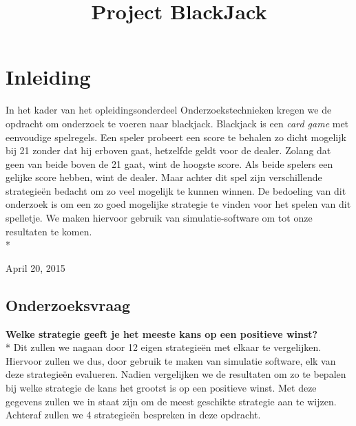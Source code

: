 \documentclass[conference]{IEEEtran}
\begin{document}
\title{Project BlackJack}
\author{
}
\maketitle

\IEEEpeerreviewmaketitle

\section{Inleiding}
In het kader van het opleidingsonderdeel Onderzoekstechnieken kregen we de opdracht om onderzoek te voeren naar blackjack. Blackjack is een {\it card game} met eenvoudige spelregels. Een speler probeert een score te behalen zo dicht mogelijk bij 21 zonder dat hij erboven gaat, hetzelfde geldt voor de dealer. Zolang dat geen van beide boven de 21 gaat, wint de hoogste score. Als beide spelers een gelijke score hebben, wint de dealer.
Maar achter dit spel zijn verschillende strategie\"en bedacht om zo veel mogelijk te kunnen winnen. De bedoeling van dit onderzoek is om een zo goed mogelijke strategie te vinden voor het spelen van dit spelletje. We maken hiervoor gebruik van simulatie-software om tot onze resultaten te komen.\\*
 
\hfill April 20, 2015

\subsection{Onderzoeksvraag}
\textbf{Welke strategie geeft je het meeste kans op een positieve winst?}\\*
Dit zullen we nagaan door 12 eigen strategie\"en met elkaar te vergelijken.
Hiervoor zullen we dus, door gebruik te maken van simulatie software, elk van deze strategie\"en evalueren.
Nadien vergelijken we de resultaten om zo te bepalen bij welke strategie de kans het grootst is op een positieve winst. Met deze gegevens zullen we in staat zijn om de meest geschikte strategie aan te wijzen.
Achteraf zullen we 4 strategie\"en bespreken in deze opdracht.
\end{document}
